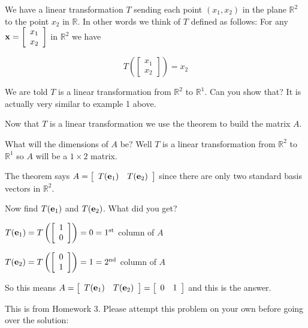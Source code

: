 \documentclass[12pt]{article}
\begin{document}
We have a linear transformation $T$ sending each point $(x_1,x_2)$ in the plane $\mathbb{R}^2$ to the point $x_2$ in $\mathbb{R}$.  In other words 
we think of $T$ defined as follows:  For any ${\bf x}=\left[ \begin{array}{c} x_1 \\ x_2  \end{array} \right]$ in $\mathbb{R}^2$ we have

\[ T \left( \left[ \begin{array}{c} x_1 \\ x_2  \end{array} \right] \right)= x_2 \]

We are told $T$ is a linear transformation from $\mathbb{R}^2$ to $\mathbb{R}^1$.  Can you show that?  It is actually very similar to example 1 above.

Now that $T$ is a linear transformation we use the theorem to build the matrix $A$.

What will the dimensions of $A$ be?  Well $T$ is a linear transformation from $\mathbb{R}^2$ to $\mathbb{R}^1$ so $A$ will be a $1\times 2$ matrix.

The theorem says $A = \left[ \begin{array}{cc} T({\bf e}_1) & T({\bf e}_2) \end{array} \right]$ since there are only two standard basis vectors in $\mathbb{R}^2$.

Now find $T({\bf e}_1)$ and $T({\bf e}_2)$.  What did you get?

$T({\bf e}_1) = T\left(  \left[ \begin{array}{c} 1 \\ 0  \end{array} \right]\right) = 0 = 1^{\text{st}}$ column of $A$

$T({\bf e}_2) = T\left(  \left[ \begin{array}{c} 0 \\ 1  \end{array} \right]\right) = 1 = 2^{\text{nd}}$ column of $A$

So this means $A = \left[ \begin{array}{cc} T({\bf e}_1) & T({\bf e}_2) \end{array} \right] = \left[ \begin{array}{cc} 0 & 1 \end{array} \right]$ and this is the answer.  



  This is from Homework 3.  Please attempt this problem on your own before going over the solution:\\
\end{document}
